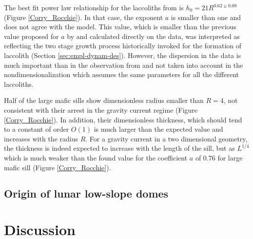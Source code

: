 The  best  fit   power  law  relationship  for   the  laccoliths  from
\citep{E:2015tl}   is   $h_0   =    21   R^{0.62\pm   0.08}$   (Figure
\ref{Corry_Rocchie}).  In that case, the  exponent $a$ is smaller than
one and  does not agree with  the model. This value,  which is smaller
than the  previous value proposed for  $a$ by \citet{McCaffrey:1997ea}
and calculated directly on the data, was interpreted as reflecting the
two stage  growth process  historically invoked  for the  formation of
laccolith (Section \ref{sec:empl-dynam-des}).  However, the dispersion
in  the  data   is  much  important  than  in   the  observation  from
\citet{Rocchi:2010dn}   and   not   taken    into   account   in   the
nondimensionalization which  assumes the  same parameters for  all the
different laccoliths.

Half of the  large mafic sills show dimensionless  radius smaller than
$R=4$, not consistent with their  arrest in the gravity current regime
(Figure  \ref{Corry_Rocchie}).    In  addition,   their  dimensionless
thickness, which  should tend to  a constant  of order $O(1)$  is much
larger than the expected value and increases with the radius $R$.  For
a  gravity current  in a  two dimensional  geometry, the  thickness is
indeed  expected to  increase  with the  length of  the  sill, but  as
$L^{1/4}$ \citet{Michaut:2011kg}  which is much weaker  than the found
value for the  coefficient $a$ of $0.76$ for large  mafic sill (Figure
\ref{Corry_Rocchie}).

\subsection{Origin of lunar low-slope domes}
\label{sec:observ-vs-pred}


\section{Discussion}
\label{C2-sec:discussion}







